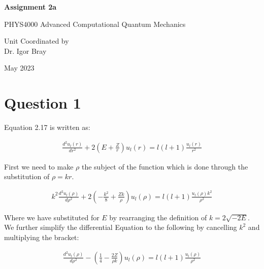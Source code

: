 \documentclass{article}
\begin{document}
\newpage
\begin{center}
       
       \vspace*{1cm}
        \LARGE
       \textbf{Assignment 2a}

       \vspace{0.5cm}
        PHYS4000
        Advanced Computational Quantum Mechanics
            
       \vspace{1.5cm}

       \bigskip

       Unit Coordinated by\\
       Dr. Igor Bray
            
       \vspace{0.8cm}
     
            
       
       May 2023
            
\end{center}
\newpage



\section{Question 1}

Equation 2.17 is written as:

    \begin{gather}
        \frac{d^2u_l(r)}{dr^2} + 2(E+\frac{Z}{r}) u_l(r) = l(l+1)\frac{u_l(r)}{r^2}
    \end{gather}

    First we need to make $\rho$ the subject of the function which is done through the substitution of
    $\rho=kr$.

    \begin{gather}
        k^2 \frac{d^2u_l(\rho)}{d\rho^2} + 2(-\frac{k^2}{8}+\frac{Zk}{\rho})u_l(\rho) =  l(l+1)\frac{u_l(\rho)k^2}{\rho^2}
    \end{gather}

    Where we have substituted for $E$ by rearranging the definition of $k=2\sqrt{-2E}$. 
    We further simplify the differential Equation to the following by cancelling $k^2$ and multiplying the bracket:

    \begin{gather}
        \frac{d^2u_l(\rho)}{d\rho^2} - (\frac{1}{4}-\frac{2Z}{\rho k})u_l(\rho) =  l(l+1)\frac{u_l(\rho)}{\rho^2}
    \end{gather}
\end{document}
